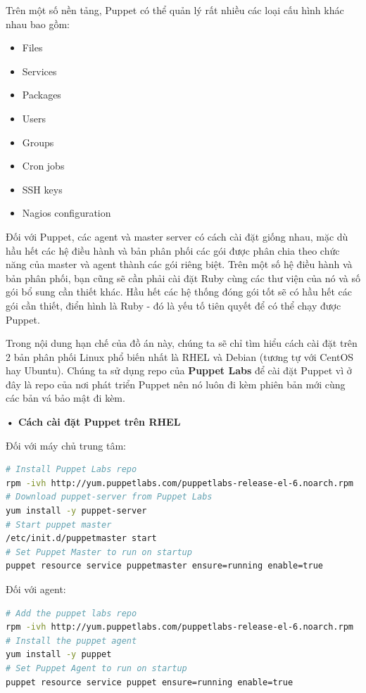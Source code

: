 Trên một số nền tảng, Puppet có thể quản lý rất nhiều các loại cấu hình khác nhau bao gồm:
\begin{itemize}
  \item Files
  \item Services
  \item Packages
  \item Users
  \item Groups
  \item Cron jobs
  \item SSH keys
  \item Nagios configuration
\end{itemize}

Đối với Puppet, các agent và master server có cách cài đặt giống nhau, mặc dù hầu hết các hệ điều hành và bản phân phối các gói được phân chia theo chức năng của master và agent thành các gói riêng biệt. Trên một số hệ điều hành và bản phân phối, bạn cũng sẽ cần phải cài đặt Ruby cùng các thư viện của nó và số gói bổ sung cần thiết khác. Hầu hết các hệ thống đóng gói tốt sẽ có hầu hết các gói cần thiết, điển hình là Ruby - đó là yếu tố tiên quyết để có thể chạy được Puppet.

Trong nội dung hạn chế của đồ án này, chúng ta sẽ chỉ tìm hiểu cách cài đặt trên 2 bản phân phối Linux phổ biến nhất là RHEL và Debian (tương tự với CentOS hay Ubuntu). Chúng ta sử dụng repo của \textbf{Puppet Labs} để cài đặt Puppet vì ở đây là repo của nơi phát triển Puppet nên nó luôn đi kèm phiên bản mới cùng các bản vá bảo mật đi kèm.

\textbf{• Cách cài đặt Puppet trên RHEL}

Đối với máy chủ trung tâm:

\begin{lstlisting}[label={lst:puppet_install_master_rhel},caption={Cách cài đặt puppet master trên RHEL}, language=bash, deletekeywords={enable, true}]
# Install Puppet Labs repo
rpm -ivh http://yum.puppetlabs.com/puppetlabs-release-el-6.noarch.rpm
# Download puppet-server from Puppet Labs
yum install -y puppet-server
# Start puppet master
/etc/init.d/puppetmaster start
# Set Puppet Master to run on startup
puppet resource service puppetmaster ensure=running enable=true
\end{lstlisting}

\newpage
\clearpage
Đối với agent:

\begin{lstlisting}[label={lst:puppet_install_agent_rhel},caption={Cách cài đặt puppet agent trên RHEL}, language=bash, deletekeywords={enable, true}]
# Add the puppet labs repo
rpm -ivh http://yum.puppetlabs.com/puppetlabs-release-el-6.noarch.rpm
# Install the puppet agent
yum install -y puppet
# Set Puppet Agent to run on startup
puppet resource service puppet ensure=running enable=true
\end{lstlisting}

